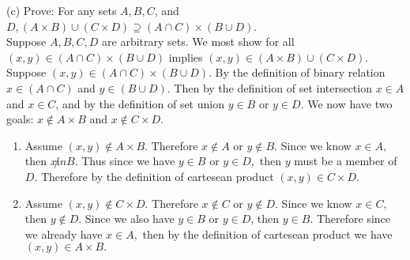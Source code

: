 \documentclass[12pt, letterpaper]{article}
\begin{document}
(c) Prove: For any sets $A, B, C$, and $D,(A \times B) \cup(C \times D) \supseteq(A \cap C) \times(B \cup D)$.\\
Suppose $A, B, C, D$ are arbitrary sets.  We most show for all $(x,y) \in (A \cap C) \times(B \cup D) $ implies $(x,y) \in (A \times B) \cup(C \times D).$  Suppose $(x,y) \in (A \cap C) \times(B \cup D).$  By the definition of binary relation $x \in(A \cap C) $ and $y \in (B \cup D)$.  Then by the definition of set intersection $x\in A$ and $x \in C$, and by the definition of set union $y \in B$ or $y \in D$.  We now have two goals: $x \not \in A \times B$ and $x \not \in C \times D.$
\begin{enumerate}
	\item Assume $(x,y) \not \in A \times B.$  Therefore $x \not \in A$ or $y \not \in B.$  Since we know $x \in A, $ then $x \not in B.$  Thus since we have $y \in B$ or $y \in D,$ then $y$ must be a member of $D$.  Therefore by the definition of cartesean product $(x,y) \in C \times D.$
	\item Assume $(x,y) \not \in C \times D.$  Therefore $x \not \in C$ or $y \not \in D.$  Since we know $x \in C,$ then $y \not \in D.$  Since we also have $y \in B$ or $y \in D$, then $y \in B.$  Therefore since we already have $x \in A,$ then by the definition of cartesean product we have $(x,y) \in A \times B.$
	
\end{enumerate}
\end{document}
